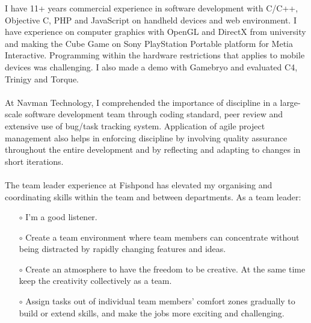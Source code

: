 \begin{resume}
I have 11+ years commercial experience in software development with C/C++, Objective C, PHP and JavaScript on handheld devices and web environment. I have experience on computer graphics with OpenGL and DirectX from university and making the Cube Game on Sony PlayStation Portable platform for Metia Interactive. Programming within the hardware restrictions that applies to mobile devices was challenging. I also made a demo with Gamebryo and evaluated C4, Trinigy and Torque.
\\\\
At Navman Technology, I comprehended the importance of discipline in a large-scale software development team through coding standard, peer review and extensive use of bug/task tracking system. Application of agile project management also helps in enforcing discipline by involving quality assurance throughout the entire development and by reflecting and adapting to changes in short iterations.
\\\\
The team leader experience at Fishpond has elevated my organising and coordinating skills within the team and between departments. As a team leader: \\
\begin{itemize}
\item[$\circ$] I'm a good listener.
\item[$\circ$] Create a team environment where team members can concentrate without being distracted by rapidly changing features and ideas.
\item[$\circ$] Create an atmosphere to have the freedom to be creative. At the same time keep the creativity collectively as a team.
\item[$\circ$] Assign tasks out of individual team members' comfort zones gradually to build or extend skills, and make the jobs more exciting and challenging.\\
\end{itemize}


\end{resume}
